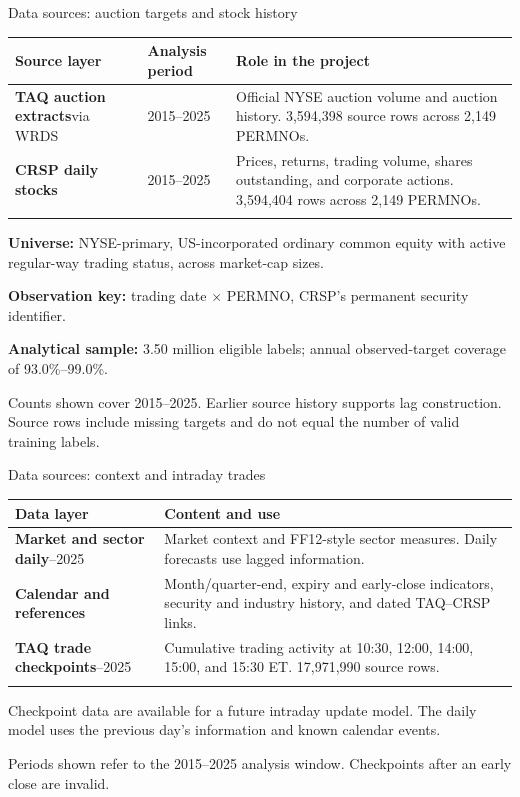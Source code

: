 \documentclass[aspectratio=169,11pt]{beamer}
\newcommand{\source}[1]{\par\vfill{\fontsize{7.5}{9}\selectfont\color{Muted}#1\par}}
\begin{document}
\begin{frame}{Data sources: auction targets and stock history}
\small
\begin{tabularx}{\textwidth}{@{}L{3.0cm}L{2.3cm}Y@{}}
\toprule
\textbf{Source layer} & \textbf{Analysis period} & \textbf{Role in the project}\\
\midrule
\addlinespace[0.4em]
\textbf{TAQ auction extracts}\newline via WRDS & 2015--2025 & Official NYSE auction volume and auction history. 3,594,398 source rows across 2,149 PERMNOs.\\
\addlinespace[0.5em]\midrule\addlinespace[0.5em]
\textbf{CRSP daily stocks} & 2015--2025 & Prices, returns, trading volume, shares outstanding, and corporate actions. 3,594,404 rows across 2,149 PERMNOs.\\
\addlinespace[0.4em]
\bottomrule
\end{tabularx}
\par\medskip
\textbf{Universe:} NYSE-primary, US-incorporated ordinary common equity with active regular-way trading status, across market-cap sizes.
\par\medskip
\textbf{Observation key:} trading date $\times$ PERMNO, CRSP's permanent security identifier.
\par\medskip
{\small\textbf{Analytical sample:} 3.50 million eligible labels; annual observed-target coverage of 93.0\%--99.0\%.\par}
\source{Counts shown cover 2015--2025. Earlier source history supports lag construction. Source rows include missing targets and do not equal the number of valid training labels.}
\end{frame}

\begin{frame}{Data sources: context and intraday trades}
\small
\begin{tabularx}{\textwidth}{@{}L{3.1cm}Y@{}}
\toprule
\textbf{Data layer} & \textbf{Content and use}\\
\midrule
\addlinespace[0.4em]
\textbf{Market and sector daily}--2025 & Market context and FF12-style sector measures. Daily forecasts use lagged information.\\
\addlinespace[0.5em]\midrule\addlinespace[0.5em]
\textbf{Calendar and references} & Month/quarter-end, expiry and early-close indicators, security and industry history, and dated TAQ--CRSP links.\\
\addlinespace[0.5em]\midrule\addlinespace[0.5em]
\textbf{TAQ trade checkpoints}--2025 & Cumulative trading activity at 10:30, 12:00, 14:00, 15:00, and 15:30 ET. 17,971,990 source rows.\\
\addlinespace[0.4em]
\bottomrule
\end{tabularx}
\par\medskip
Checkpoint data are available for a future intraday update model. The daily model uses the previous day's information and known calendar events.
\source{Periods shown refer to the 2015--2025 analysis window. Checkpoints after an early close are invalid.}
\end{frame}
\end{document}

